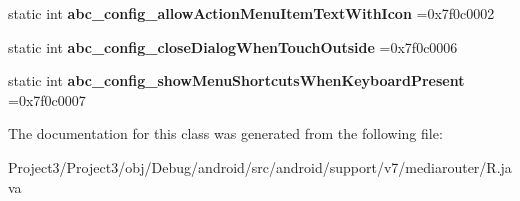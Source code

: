 \begin{DoxyCompactItemize}
static int {\bfseries abc\+\_\+config\+\_\+allow\+Action\+Menu\+Item\+Text\+With\+Icon} =0x7f0c0002
\item 
\mbox{\label{classandroid_1_1support_1_1v7_1_1mediarouter_1_1R_1_1bool_a6db91f23f8ec3a95c51d840b2e9c4f42}} 
static int {\bfseries abc\+\_\+config\+\_\+close\+Dialog\+When\+Touch\+Outside} =0x7f0c0006
\item 
\mbox{\label{classandroid_1_1support_1_1v7_1_1mediarouter_1_1R_1_1bool_a2272c69f849ada13d8932c55dfa281c9}} 
static int {\bfseries abc\+\_\+config\+\_\+show\+Menu\+Shortcuts\+When\+Keyboard\+Present} =0x7f0c0007
\end{DoxyCompactItemize}


The documentation for this class was generated from the following file\+:\begin{DoxyCompactItemize}
\item 
Project3/\+Project3/obj/\+Debug/android/src/android/support/v7/mediarouter/R.\+java\end{DoxyCompactItemize}
